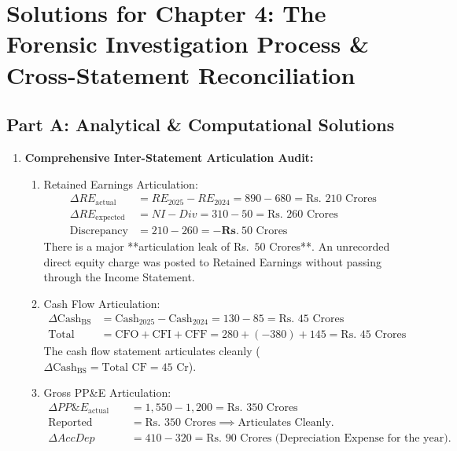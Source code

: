 \newpage
\section*{Solutions for Chapter 4: The Forensic Investigation Process \& Cross-Statement Reconciliation}

\subsection*{Part A: Analytical \& Computational Solutions}

\begin{enumerate}[label=\textbf{P4.\arabic*}]
    \item \textbf{Comprehensive Inter-Statement Articulation Audit:}
    \begin{enumerate}[label=(\alph*)]
        \item Retained Earnings Articulation:
        \begin{align*}
        \Delta RE_{\text{actual}} &= RE_{2025} - RE_{2024} = 890 - 680 = \text{Rs.~} 210\text{ Crores} \\
        \Delta RE_{\text{expected}} &= NI - Div = 310 - 50 = \text{Rs.~} 260\text{ Crores} \\
        \text{Discrepancy} &= 210 - 260 = \mathbf{-Rs.~} 50\text{ Crores}
        \end{align*}
        There is a major **articulation leak of Rs.~$50$ Crores**. An unrecorded direct equity charge was posted to Retained Earnings without passing through the Income Statement.
        \item Cash Flow Articulation:
        \begin{align*}
        \Delta \text{Cash}_{\text{BS}} &= \text{Cash}_{2025} - \text{Cash}_{2024} = 130 - 85 = \text{Rs.~} 45\text{ Crores} \\
        \text{Total Cash Flow} &= \text{CFO} + \text{CFI} + \text{CFF} = 280 + (-380) + 145 = \text{Rs.~} 45\text{ Crores}
        \end{align*}
        The cash flow statement articulates cleanly ($\Delta \text{Cash}_{\text{BS}} = \text{Total CF} = 45\text{ Cr}$).
        \item Gross PP\&E Articulation:
        \begin{align*}
        \Delta PP\&E_{\text{actual}} &= 1{,}550 - 1{,}200 = \text{Rs.~} 350\text{ Crores} \\
        \text{Reported CapEx} &= \text{Rs.~} 350\text{ Crores} \implies \text{Articulates Cleanly.} \\
        \Delta AccDep &= 410 - 320 = \text{Rs.~} 90\text{ Crores (Depreciation Expense for the year)}.
        \end{align*}
    \end{enumerate}


\end{enumerate}
